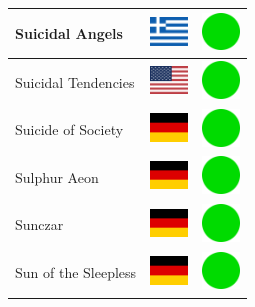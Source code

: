 \documentclass[12pt, a4paper, twoside]{report}
\begin{document}
\begin{center}
\begin{longtable}{|p{5cm}|p{2cm}|p{2cm}|}
 Suicidal Angels                                            & \includegraphics[width=1cm]{../img/flags/gr} &   \includegraphics[width=1cm]{../likes/y} \\ \hline
 Suicidal Tendencies                                        & \includegraphics[width=1cm]{../img/flags/us} &   \includegraphics[width=1cm]{../likes/y} \\ \hline
 Suicide of Society                                         & \includegraphics[width=1cm]{../img/flags/de} &   \includegraphics[width=1cm]{../likes/y} \\ \hline
 Sulphur Aeon                                               & \includegraphics[width=1cm]{../img/flags/de} &   \includegraphics[width=1cm]{../likes/y} \\ \hline
 Sunczar                                                    & \includegraphics[width=1cm]{../img/flags/de} &   \includegraphics[width=1cm]{../likes/y} \\ \hline
 Sun of the Sleepless                                       & \includegraphics[width=1cm]{../img/flags/de} &   \includegraphics[width=1cm]{../likes/y} \\ \hline

\end{longtable}
\end{center}
\end{document}
